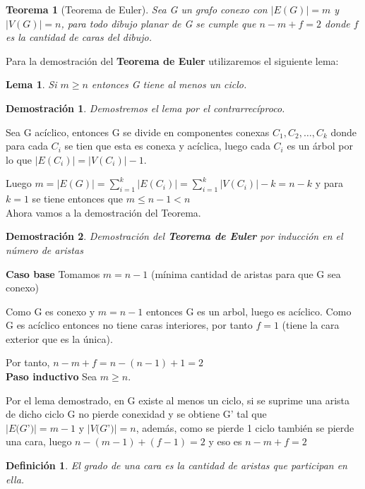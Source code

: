 \documentclass[a4paper,1pt]{report}
\newtheorem*{teo}{Teorema}
\newtheorem*{dem}{Demostración}
\newtheorem*{dfn}{Definición}
\newtheorem*{lem}{Lema}
\begin{document}
\begin{teo}[Teorema de Euler]
Sea G un grafo conexo con $|E(G)|=m$  y $|V(G)|=n$, para todo dibujo planar de G se cumple que $n-m+f=2$ donde $f$ es la cantidad de caras del dibujo.
\end{teo}

Para la demostración del \textbf{Teorema de Euler} utilizaremos el siguiente lema:

\begin{lem}
 Si $m\geq n$ entonces G tiene al menos un ciclo.
\end{lem}

\begin{dem}
Demostremos el lema por el contrarrecíproco. 
\end{dem}

Sea G acíclico, entonces G se divide en componentes conexas $C_1,C_2,\dots,C_k$ donde para cada $C_i$ se tien que esta es conexa y acíclica, luego cada $C_i$ es un árbol por lo que $|E(C_i)|=|V(C_i)|-1$. 

Luego $m=|E(G)|=\sum^k_{i=1}|E(C_i)|=\sum^k_{i=1}|V(C_i)|-k=n-k$ y para $k=1$ se tiene entonces que $m\leq n-1 < n$\\

Ahora vamos a la demostración del Teorema.

\begin{dem}
Demostración del \textbf{Teorema de Euler} por inducción en el número de aristas
\end{dem}


\textbf{Caso base} Tomamos $m=n-1$ (mínima cantidad de aristas para que G sea conexo)

Como G es conexo y  $m=n-1$  entonces G es un arbol, luego es acíclico. Como G es acíclico entonces no tiene caras interiores, por tanto $f=1$ (tiene la cara exterior que es la única).

Por tanto, $n-m+f=n - (n-1)+1=2$\\



\textbf{Paso inductivo} Sea $m\geq n$.

Por el lema demostrado, en G existe al menos un ciclo, si se suprime una arista de dicho ciclo G no pierde conexidad y se obtiene G'  tal que \\
$|E(G$'$)| = m-1$ y $|V(G$'$)|=n$, además, como se pierde 1 ciclo también se pierde una cara, luego $n-(m-1)+ (f-1)=2$ y eso es $n-m+f=2$

\begin{dfn}
 El grado de una cara es la cantidad de aristas que participan en ella.
\end{dfn}
\end{document}
